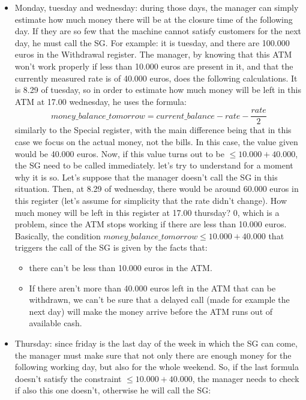 \documentclass{article}
\begin{document}
\begin{itemize}
    \item Monday, tuesday and wednesday: during those days, the manager can simply estimate how much money there will be at the closure time of the following day. If they are so few that the machine cannot satisfy customers for the next day, he must call the SG. For example:
    \newline it is tuesday, and there are 100.000 euros in the Withdrawal register. The manager, by knowing that this ATM won't work properly if less than 10.000 euros are present in it, and that the currently measured rate is of 40.000 euros, does the following calculations. It is 8.29 of tuesday, so in order to estimate how much money will be left in this ATM at 17.00 wednesday, he uses the formula:
    \begin{equation*}
        money\_balance\_tomorrow = current\_balance - rate - \frac{rate}{2}
    \end{equation*}
    similarly to the Special register, with the main difference being that in this case we focus on the actual money, not the bills. In this case, the value given would be 40.000 euros.
    \newline Now, if this value turns out to be $\leq 10.000 + 40.000$, the SG need to be called immediately. let's try to understand for a moment why it is so. Let's suppose that the manager doesn't call the SG in this situation. Then, at 8.29 of wednesday, there would be around 60.000 euros in this register (let's assume for simplicity that the rate didn't change). How much money will be left in this register at 17.00 thursday? 0, which is a problem, since the ATM stops working if there are less than 10.000 euros. Basically, the condition $money\_balance\_tomorrow \leq 10.000 + 40.000$ that triggers the call of the SG is given by the facts that:
    \begin{itemize}
        \item there can't be less than 10.000 euros in the ATM.
        \item If there aren't more than 40.000 euros left in the ATM that can be withdrawn, we can't be sure that a delayed call (made for example the next day) will make the money arrive before the ATM runs out of available cash.
    \end{itemize}
    \item Thursday: since friday is the last day of the week in which the SG can come, the manager must make sure that not only there are enough money for the following working day, but also for the whole weekend. So, if the last formula doesn't satisfy the constraint $\leq 10.000 + 40.000$, the manager needs to check if also this one doesn't, otherwise he will call the SG:

\end{itemize}
\end{document}
